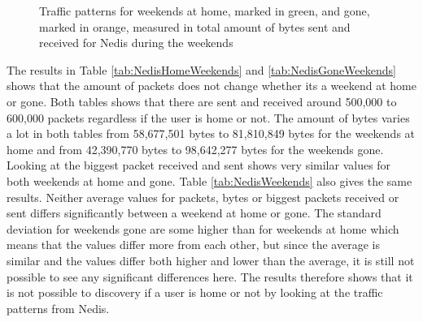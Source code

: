 \begin{figure}[H]
    \begin{subfigure}[b]{0.47\textwidth}
    \end{subfigure}
    \begin{subfigure}[b]{0.47\textwidth}
    \end{subfigure}
   \begin{subfigure}[b]{0.47\textwidth}
    \end{subfigure}
    \hspace{0.6cm}
    \begin{subfigure}[b]{0.47\textwidth}
    \end{subfigure}
  \caption{Traffic patterns for weekends at home, marked in green, and gone, marked in orange, measured in total amount of bytes sent and received for Nedis during the weekends}
    \label{fig:NedisWeekendBytes}
\end{figure}

The results in Table \ref{tab:NedisHomeWeekends} and \ref{tab:NedisGoneWeekends} shows that the amount of packets does not change whether its a weekend at home or gone. Both tables shows that there are sent and received around 500,000 to 600,000 packets regardless if the user is home or not. The amount of bytes varies a lot in both tables from 58,677,501 bytes to 81,810,849 bytes for the weekends at home and from 42,390,770 bytes to 98,642,277 bytes for the weekends gone. Looking at the biggest packet received and sent shows very similar values for both weekends at home and gone. Table \ref{tab:NedisWeekends} also gives the same results. Neither average values for packets, bytes or biggest packets received or sent differs significantly between a weekend at home or gone. The standard deviation for weekends gone are some higher than for weekends at home which means that the values differ more from each other, but since the average is similar and the values differ both higher and lower than the average, it is still not possible to see any significant differences here. The results therefore shows that it is not possible to discovery if a user is home or not by looking at the traffic patterns from Nedis. 

